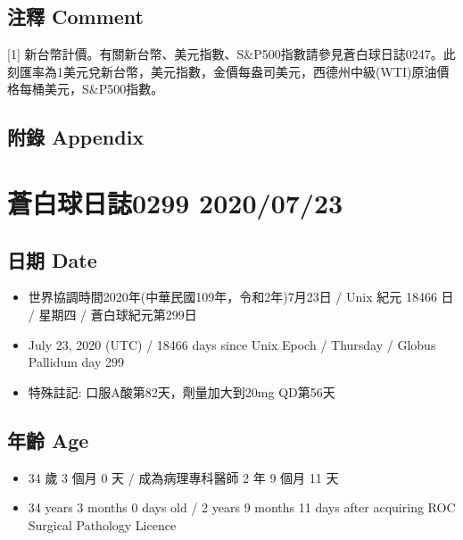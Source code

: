 \documentclass[
]{article}
\providecommand{\tightlist}{%
  \setlength{\itemsep}{0pt}\setlength{\parskip}{0pt}}
\begin{document}
\hypertarget{ux6ce8ux91cb-comment-21}{%
\subsection{注釋 Comment}\label{ux6ce8ux91cb-comment-21}}

{[}1{]}
新台幣計價。有關新台幣、美元指數、S\&P500指數請參見蒼白球日誌0247。此刻匯率為1美元兌新台幣，美元指數，金價每盎司美元，西德州中級(WTI)原油價格每桶美元，S\&P500指數。

\hypertarget{ux9644ux9304-appendix-21}{%
\subsection{附錄 Appendix}\label{ux9644ux9304-appendix-21}}

\hypertarget{ux84bcux767dux7403ux65e5ux8a8c0299-20200723}{%
\section{蒼白球日誌0299
2020/07/23}\label{ux84bcux767dux7403ux65e5ux8a8c0299-20200723}}

\hypertarget{ux65e5ux671f-date-22}{%
\subsection{日期 Date}\label{ux65e5ux671f-date-22}}

\begin{itemize}
\tightlist
\item
  世界協調時間2020年(中華民國109年，令和2年)7月23日 / Unix 紀元 18466 日
  / 星期四 / 蒼白球紀元第299日
\item
  July 23, 2020 (UTC) / 18466 days since Unix Epoch / Thursday / Globus
  Pallidum day 299
\item
  特殊註記: 口服A酸第82天，劑量加大到20mg QD第56天
\end{itemize}

\hypertarget{ux5e74ux9f61-age-22}{%
\subsection{年齡 Age}\label{ux5e74ux9f61-age-22}}

\begin{itemize}
\tightlist
\item
  34 歲 3 個月 0 天 / 成為病理專科醫師 2 年 9 個月 11 天
\item
  34 years 3 months 0 days old / 2 years 9 months 11 days after
  acquiring ROC Surgical Pathology Licence
\end{itemize}
\end{document}
